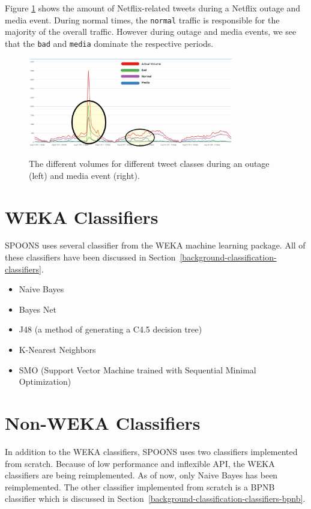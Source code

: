 \documentclass[12pt]{ucthesis}
\newcommand{\captionfonts}{\small\bf\ssp}
\begin{document}
Figure \ref{fig:groups} shows the amount of Netflix-related tweets during a Netflix outage and media event.
During normal times, the \texttt{normal} traffic is responsible for the majority of the overall traffic.
However during outage and media events, we see that the \texttt{bad} and \texttt{media} dominate the respective
periods.

\begin{figure}
   \begin{center}
      \includegraphics[width=0.8\textwidth]{images/groups.eps}
      \captionfonts
      \caption[SPOONS Groups]{The different volumes for different tweet classes during an outage (left) and media event (right).}
      \label{fig:groups}
   \end{center}
\end{figure}

\chapter{WEKA Classifiers}
\label{class-weka}
SPOONS uses several classifier from the WEKA machine learning package\cite{weka}.
All of these classifiers have been discussed in Section~\ref{background-classification-classifiers}.

\begin{itemize}
   \item Naive Bayes
   \item Bayes Net
   \item J48 (a method of generating a C4.5 decision tree\cite{j48})
   \item K-Nearest Neighbors
   \item SMO (Support Vector Machine trained with Sequential Minimal Optimization\cite{smo})
\end{itemize}

\chapter{Non-WEKA Classifiers}
\label{class-nonweka}
In addition to the WEKA classifiers, SPOONS uses two classifiers implemented from scratch.
Because of low performance and inflexible API, the WEKA classifiers are being reimplemented.
As of now, only Naive Bayes has been reimplemented. The other classifier implemented from scratch is
a BPNB classifier which is discussed in Section~\ref{background-classification-classifiers-bpnb}.
\end{document}
